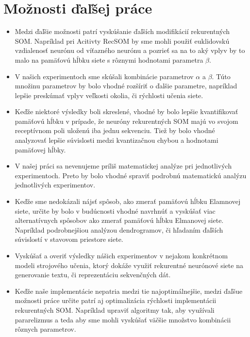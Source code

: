 \section{Možnosti ďaľšej práce}
\begin{itemize}
    \item Medzi ďaľšie možnosti patrí vyskúšanie ďaľších modifikácií rekurentných SOM. 
    Napríklad pri Acitivty RecSOM by sme mohli použiť euklidovskú vzdialenosť neurónu od víťazného neurónu a pozrieť sa na to aký vplyv by to malo 
    na pamäťovú hĺbku siete s rôznymi hodnotami parametra $\beta$.
    \item V našich experimentoch sme skúšali kombinácie parametrov $\alpha$ a $\beta$. Túto množinu parametrov by bolo vhodné rozšíriť o ďalšie parametre, napríklad
    lepšie preskúmať vplyv veľkosti okolia, či rýchlosti učenia siete.
    \item Keďže niektoré výsledky boli skreslené, vhodné by bolo lepšie kvantifikovať pamäťovú hĺbku v prípade, že neuróny rekurentných SOM majú vo svojom
    receptívnom poli uloženú iba jednu sekvenciu. 
    Tiež by bolo vhodné analyzovať lepšie súvislosti medzi kvantizačnou chybou a hodnotami pamäťovej hĺbky.
    \item V našej práci sa nevenujeme príliš matematickej analýze pri jednotlivých experimentoch.
    Preto by bolo vhodné spraviť podrobnú matematickú analýzu jednotlivých experimentov.
    \item Keďže sme nedokázali nájsť spôsob, ako zmerať pamäťovú hĺbku Elamnovej siete, určite by bolo 
    v budúcnosti vhodné navrhnúť a vyskúšať viac alternatívnych spôsobov ako zmerať pamäťovú hĺbku Elmanovej siete. 
    Napríklad podrobnejšiou analýzou dendrogramov, či hľadaním ďaľších súvislostí v stavovom priestore siete.
    \item Vyskúšať a overiť výsledky nášich experimentov v nejakom konkrétnom modeli strojového učenia, ktorý dokáže 
    využiť rekurentné neurónové siete na generovanie textu, či reprezentáciu sekvenčných dát.
    \item Keďže naše implementácie nepatria medzi tie najoptimálnejšie, medzi ďaľšue možnosti práce
    určite patrí aj optimalizácia rýchlosti implementácii rekurentných SOM. Napríklad upraviť algoritmy tak, aby využívali
    pararelizmus a teda aby sme mohli vyskúšať väčšie množstvo kombinácii rôznych parametrov.
\end{itemize}





